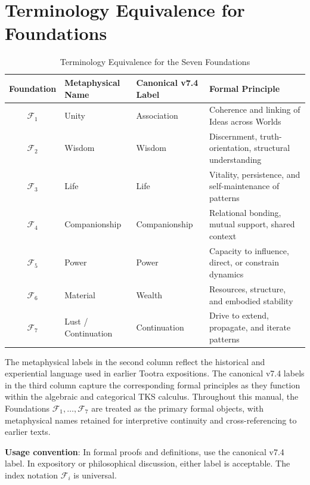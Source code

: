 \documentclass[11pt,twoside,openright]{book}
\theoremstyle{definition}
\theoremstyle{plain}
\theoremstyle{remark}
\newcommand{\Foundations}{\mathcal{F}}
\begin{document}
\section{Terminology Equivalence for Foundations}
\label{sec:foundation-terminology}

\begin{table}[ht]
\centering
\caption{Terminology Equivalence for the Seven Foundations}
\label{tab:foundation-equivalence}
\renewcommand{\arraystretch}{1.2}
\begin{tabular}{c l l p{6cm}}
\toprule
\textbf{Foundation} & \textbf{Metaphysical Name} & \textbf{Canonical v7.4 Label} & \textbf{Formal Principle} \\
\midrule
$\Foundations_1$ & Unity & Association & Coherence and linking of Ideas across Worlds \\
$\Foundations_2$ & Wisdom & Wisdom & Discernment, truth-orientation, structural understanding \\
$\Foundations_3$ & Life & Life & Vitality, persistence, and self-maintenance of patterns \\
$\Foundations_4$ & Companionship & Companionship & Relational bonding, mutual support, shared context \\
$\Foundations_5$ & Power & Power & Capacity to influence, direct, or constrain dynamics \\
$\Foundations_6$ & Material & Wealth & Resources, structure, and embodied stability \\
$\Foundations_7$ & Lust / Continuation & Continuation & Drive to extend, propagate, and iterate patterns \\
\bottomrule
\end{tabular}
\end{table}

\begin{tcolorbox}[colback=green!5!white,colframe=green!60!black,title=\textbf{Interpretive Notes}]
The metaphysical labels in the second column reflect the historical and experiential language used in earlier Tootra expositions. The canonical v7.4 labels in the third column capture the corresponding formal principles as they function within the algebraic and categorical TKS calculus. Throughout this manual, the Foundations $\Foundations_1,\dots,\Foundations_7$ are treated as the primary formal objects, with metaphysical names retained for interpretive continuity and cross-referencing to earlier texts.

\medskip
\noindent\textbf{Usage convention}: In formal proofs and definitions, use the canonical v7.4 label. In expository or philosophical discussion, either label is acceptable. The index notation $\Foundations_i$ is universal.
\end{tcolorbox}
\end{document}
